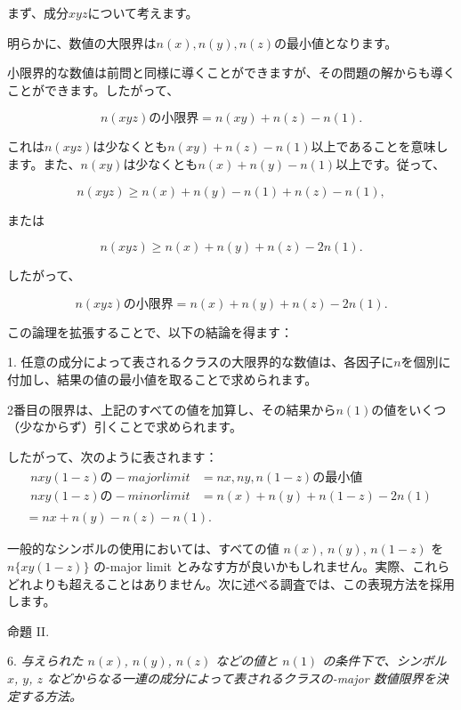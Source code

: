 \documentclass[a4paper,11pt,openany]{ltjsbook}
\begin{document}
まず、成分$xyz$について考えます。

明らかに、数値の大限界は$n(x), n(y), n(z)$の最小値となります。

小限界的な数値は前問と同様に導くことができますが、その問題の解からも導くことができます。したがって、

\[
  n(xyz) の小限界 = n(xy) + n(z) - n(1). \tag{1}
\]

これは$n(xyz)$は少なくとも$n(xy) + n(z) - n(1)$以上であることを意味します。また、$n(xy)$は少なくとも$n(x) + n(y) - n(1)$以上です。従って、

\[
  n(xyz) \geq n(x) + n(y) - n(1) + n(z) - n(1),
\]

または

\[
  n(xyz) \geq n(x) + n(y) + n(z) - 2n(1).
\]

したがって、

\[
  n(xyz) の小限界 = n(x) + n(y) + n(z) - 2n(1).
\]

この論理を拡張することで、以下の結論を得ます：

1. 任意の成分によって表されるクラスの大限界的な数値は、各因子に$n$を個別に付加し、結果の値の最小値を取ることで求められます。

2番目の限界は、上記のすべての値を加算し、その結果から$n(1)$の値をいくつ（少なからず）引くことで求められます。

したがって、次のように表されます：
\begin{multline*}
 \begin{aligned}
  nxy(1-z) の-major limit &= nx, ny, n(1-z) の最小値 \\
  nxy(1-z) の-minor limit &= n(x) + n(y) + n(1-z) - 2n(1)
 \end{aligned}
\\= nx + n(y) - n(z) - n(1).
\end{multline*}

一般的なシンボルの使用においては、すべての値 $n(x)$, $n(y)$, $n(1-z)$ を $n\{xy(1-z)\}$ の-major limit とみなす方が良いかもしれません。実際、これらどれよりも超えることはありません。次に述べる調査では、この表現方法を採用します。

\begin{center}\textsc{命題 II.}\end{center}

6. \emph{与えられた $n(x)$, $n(y)$, $n(z)$ などの値と $n(1)$ の条件下で、シンボル $x$, $y$, $z$ などからなる一連の成分によって表されるクラスの-major 数値限界を決定する方法。}
\end{document}
